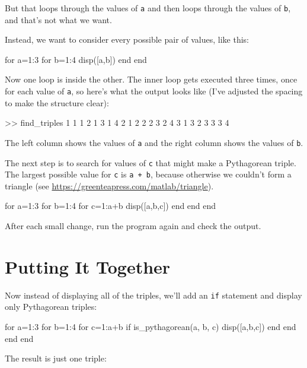 But that loops through the values of \lstinline{a} and then loops through the values of \lstinline{b}, and that's not what we want.

Instead, we want to consider every possible pair of values, like this:

\begin{code}
for a=1:3
    for b=1:4
        disp([a,b])
    end
end
\end{code}

Now one loop is inside the other.  The inner loop gets executed three times, once for each value of \lstinline{a}, so here's what the output looks like (I've adjusted the spacing to make the structure clear):

\begin{code}
>> find_triples
     1     1
     1     2
     1     3
     1     4
     2     1
     2     2
     2     3
     2     4
     3     1
     3     2
     3     3
     3     4
\end{code}

The left column shows the values of \lstinline{a} and the right column shows the values of \lstinline{b}.

The next step is to search for values of \lstinline{c} that might make a Pythagorean triple.  The largest possible value for \lstinline{c} is \lstinline{a + b}, because otherwise we couldn't form a triangle 
(see \url{https://greenteapress.com/matlab/triangle}).

\begin{code}
for a=1:3
    for b=1:4
        for c=1:a+b
            disp([a,b,c])
        end
    end
end
\end{code}

After each small change, run the program again and check the output.

\section{Putting It Together}

Now instead of displaying all of the triples, we'll add an \lstinline{if} statement and display only Pythagorean triples:

\begin{code}
for a=1:3
    for b=1:4
        for c=1:a+b
            if is_pythagorean(a, b, c)
                disp([a,b,c])
            end
        end
    end
end
\end{code}

The result is just one triple:

